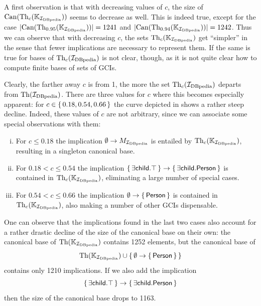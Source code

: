 A first observation is that with decreasing values of $c$, the size of $\operatorname{Can}(\operatorname{Th}_c({\mathbb{K}}_{{\mathcal{I}_{\text{DBpedia}}}}))$ seems to decrease as well.  This is indeed true, except for the case
$\lvert \operatorname{Can}(\operatorname{Th}_{0.95}({\mathbb{K}}_{{\mathcal{I}_{\text{DBpedia}}}})) \rvert = 1241$ and $\lvert \operatorname{Can}( \operatorname{Th}_{0.94}({\mathbb{K}}_{{\mathcal{I}_{\text{DBpedia}}}})) \rvert = 1242$.  Thus we can observe that with decreasing $c$, the sets
$\operatorname{Th}_c({\mathbb{K}}_{{\mathcal{I}_{\text{DBpedia}}}})$ get \enquote{simpler} in the sense that fewer implications are
necessary to represent them.  If the same is true for bases of $\operatorname{Th}_c({\mathcal{I}_{\text{DBpedia}}})$ is not
clear, though, as it is not quite clear how to compute finite bases of sets of GCIs.

Clearly, the farther away $c$ is from 1, the more the set $\operatorname{Th}_c({\mathcal{I}_{\text{DBpedia}}})$ departs from
$\operatorname{Th}({\mathcal{I}_{\text{DBpedia}}})$.  There are three values for $c$ where this becomes especially apparent:
for $c \in {\ensuremath{\{\, 0.18, 0.54, 0.66 \,\}}}$ the curve depicted in
 shows a rather steep decline.  Indeed, these values of
$c$ are not arbitrary, since we can associate some special observations with them:
\begin{enumerate}[i. ]
\item For $c \leq 0.18$ the implication $\emptyset \to M_{{\mathcal{I}_{\text{DBpedia}}}}$ is entailed by
  $\operatorname{Th}_c({\mathbb{K}}_{{\mathcal{I}_{\text{DBpedia}}}})$, resulting in a singleton canonical base.
\item For $0.18 < c \leq 0.54$ the implication ${\{\, \mathsf{\exists child. \top} \,\}} \to
  {\ensuremath{\{\, \mathsf{\exists child. Person} \,\}}}$ is contained in $\operatorname{Th}_c({\mathbb{K}}_{{\mathcal{I}_{\text{DBpedia}}}})$,
  eliminating a large number of special cases.
\item For $0.54 < c \leq 0.66$ the implication $\emptyset \to {\ensuremath{\{\, \mathsf{Person} \,\}}}$ is
  contained in $\operatorname{Th}_c({\mathbb{K}}_{{\mathcal{I}_{\text{DBpedia}}}})$, also making a number of other GCIs
  dispensable.
\end{enumerate}

One can observe that the implications found in the last two cases also account for a
rather drastic decline of the size of the canonical base on their own: the canonical base
of $\operatorname{Th}({\mathbb{K}}_{{\mathcal{I}_{\text{DBpedia}}}})$ contains 1252 elements, but the canonical base of
\begin{equation*}
  \operatorname{Th}({\mathbb{K}}_{{\mathcal{I}_{\text{DBpedia}}}}) \cup {\ensuremath{\{\, \emptyset \to {\ensuremath{\{\, \mathsf{Person} \,\}}} \,\}}}
\end{equation*}
contains only 1210 implications.  If we also add the implication
\begin{equation*}
  {\ensuremath{\{\, \mathsf{\exists child. \top} \,\}}} \to {\ensuremath{\{\, \mathsf{\exists child. Person} \,\}}}
\end{equation*}
then the size of the canonical base drops to 1163.

